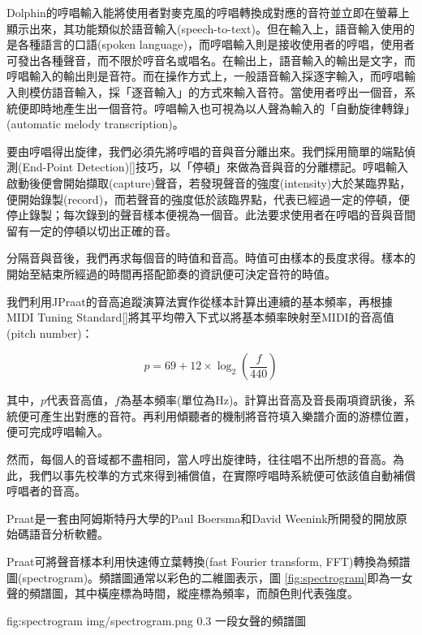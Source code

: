 \documentclass[12pt,a4paper,oneside]{report}
\begin{document}
Dolphin的哼唱輸入能將使用者對麥克風的哼唱轉換成對應的音符並立即在螢幕上顯示出來，其功能類似於語音輸入(speech-to-text)。但在輸入上，語音輸入使用的是各種語言的口語(spoken language)，而哼唱輸入則是接收使用者的哼唱，使用者可發出各種聲音，而不限於哼音名或唱名。在輸出上，語音輸入的輸出是文字，而哼唱輸入的輸出則是音符。而在操作方式上，一般語音輸入採逐字輸入，而哼唱輸入則模仿語音輸入，採「逐音輸入」的方式來輸入音符。當使用者哼出一個音，系統便即時地產生出一個音符。哼唱輸入也可視為以人聲為輸入的「自動旋律轉錄」(automatic melody transcription)。

要由哼唱得出旋律，我們必須先將哼唱的音與音分離出來。我們採用簡單的端點偵測(End-Point Detection)[]技巧，以「停頓」來做為音與音的分離標記。哼唱輸入啟動後便會開始擷取(capture)聲音，若發現聲音的強度(intensity)大於某臨界點，便開始錄製(record)，而若聲音的強度低於該臨界點，代表已經過一定的停頓，便停止錄製；每次錄到的聲音樣本便視為一個音。此法要求使用者在哼唱的音與音間留有一定的停頓以切出正確的音。

分隔音與音後，我們再求每個音的時值和音高。時值可由樣本的長度求得。樣本的開始至結束所經過的時間再搭配節奏的資訊便可決定音符的時值。

我們利用JPraat的音高追蹤演算法實作從樣本計算出連續的基本頻率，再根據MIDI Tuning Standard[]將其平均帶入下式以將基本頻率映射至MIDI的音高值(pitch number)：

\[
p=69+12\times\log_2{\left(\frac{f}{440}\right)}
\]

其中，\(p\)代表音高值，\(f\)為基本頻率(單位為Hz)。計算出音高及音長兩項資訊後，系統便可產生出對應的音符。再利用傾聽者的機制將音符填入樂譜介面的游標位置，便可完成哼唱輸入。

然而，每個人的音域都不盡相同，當人哼出旋律時，往往唱不出所想的音高。為此，我們以事先校準的方式來得到補償值，在實際哼唱時系統便可依該值自動補償哼唱者的音高。


Praat是一套由阿姆斯特丹大學的Paul Boersma和David Weenink所開發的開放原始碼語音分析軟體。

Praat可將聲音樣本利用快速傅立葉轉換(fast Fourier transform, FFT)轉換為頻譜圖(spectrogram)。頻譜圖通常以彩色的二維圖表示，圖 \ref{fig:spectrogram}即為一女聲的頻譜圖，其中橫座標為時間，縱座標為頻率，而顏色則代表強度。

\figurewithcaption
{fig:spectrogram}
{img/spectrogram.png}
{0.3}
{一段女聲的頻譜圖}
\end{document}
